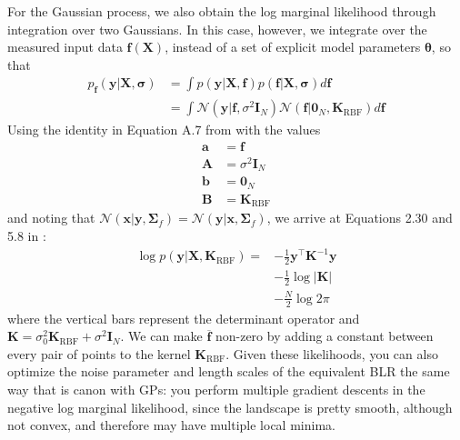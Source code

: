 \documentclass{article}
\begin{document}
For the Gaussian process, we also obtain the log marginal likelihood through integration over two Gaussians. In this case, however, we integrate over the measured input data $\mathbf{f}(\mathbf{X})$, instead of a set of explicit model parameters $\boldsymbol{\theta}$, so that
\begin{equation}
\begin{split}
    p_{\mathbf{f}}(\mathbf{y}|\mathbf{X},\boldsymbol{\sigma})&=\int p(\mathbf{y}|\mathbf{X},\mathbf{f})p(\mathbf{f}|\mathbf{X},\boldsymbol{\sigma})d\mathbf{f} \\
    &= \int \mathcal{N}(\mathbf{y}|\mathbf{f},\sigma^2\mathbf{I}_N)\mathcal{N}(\mathbf{f}|\mathbf{0}_{N},\mathbf{K}_\text{RBF})d\mathbf{f}
    \end{split}
\end{equation}Using the identity in Equation A.7 from \cite{rasmussen} with the values
\begin{equation}
\begin{split}
    \mathbf{a} &= \mathbf{f} \\
    \mathbf{A} &= \sigma^2\mathbf{I}_N \\
    \mathbf{b} &= \mathbf{0}_N \\
    \mathbf{B} &= \mathbf{K}_\text{RBF}
\end{split}
\end{equation}and noting that $\mathcal{N}(\mathbf{x}|\mathbf{y},\boldsymbol{\Sigma}_f)=\mathcal{N}(\mathbf{y}|\mathbf{x},\boldsymbol{\Sigma}_f)$, we arrive at Equations 2.30 and 5.8 in \cite{rasmussen}:
\begin{equation}
\label{eq:marginal_likelihood_of_GP}
\begin{split}
    \log p(\mathbf{y}|\mathbf{X},\mathbf{K}_\text{RBF}) =& -\frac{1}{2}\mathbf{y}^\top \mathbf{K}^{-1} \mathbf{y} \\&- \frac{1}{2}\log|\mathbf{K}|\\& - \frac{N}{2}\log 2\pi
    \end{split}
\end{equation}where the vertical bars represent the determinant operator and $\mathbf{K}=\sigma_0^2\mathbf{K}_\text{RBF}+\sigma^2 \mathbf{I}_N$. We can make $\overline{\mathbf{f}}$ non-zero by adding a constant between every pair of points to the kernel $\mathbf{K}_\text{RBF}$. Given these likelihoods, you can also optimize the noise parameter and length scales of the equivalent BLR the same way that is canon with GPs: you perform multiple gradient descents in the negative log marginal likelihood, since the landscape is pretty smooth, although not convex, and therefore may have multiple local minima. 
\end{document}
